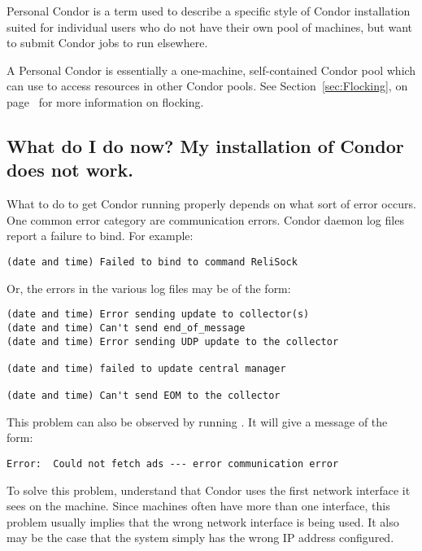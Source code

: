 Personal Condor is a term used to describe a specific style of Condor
installation suited for individual users who do not have their own
pool of machines, but want to submit Condor jobs to run elsewhere.

A Personal Condor is essentially a one-machine, self-contained Condor
pool which can use  to access resources in other Condor
pools.
See Section~\ref{sec:Flocking}, on page~\pageref{sec:Flocking} for
more information on flocking.


\subsection*{What do I do now? My installation of Condor does not work.}

What to do to get Condor running properly depends on what sort of
error occurs. 
One common error category are communication errors.
Condor daemon log files report a failure to bind.
For example:

\footnotesize
\begin{verbatim}
(date and time) Failed to bind to command ReliSock
\end{verbatim}
\normalsize

Or, the errors in the various log files may be of the form:

\footnotesize
\begin{verbatim}
(date and time) Error sending update to collector(s)
(date and time) Can't send end_of_message
(date and time) Error sending UDP update to the collector

(date and time) failed to update central manager

(date and time) Can't send EOM to the collector
\end{verbatim}
\normalsize

This problem can also be observed by running .
It will give a message of the form:
\footnotesize
\begin{verbatim}
Error:  Could not fetch ads --- error communication error
\end{verbatim}
\normalsize

To solve this problem, understand that
Condor uses the first network interface it sees on the machine.
Since machines often have more than one interface,
this problem usually implies that the wrong network
interface is being used.  It also may be the case that
the system simply has the wrong IP address configured.

